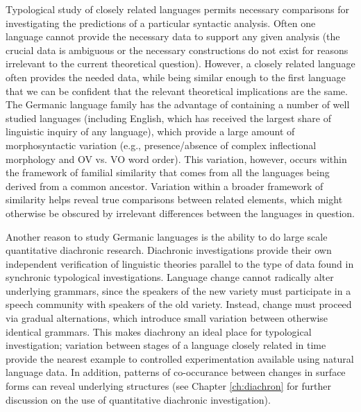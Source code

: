 Typological study of closely related languages permits necessary comparisons for investigating the predictions of a particular syntactic analysis. Often one language cannot provide the necessary data to support any given analysis (the crucial data is ambiguous or the necessary constructions do not exist for reasons irrelevant to the current theoretical question). However, a closely related language often provides the needed data, while being similar enough to the first language that we can be confident that the relevant theoretical implications are the same. The Germanic language family has the advantage of containing a number of well studied languages (including English, which has received the largest share of linguistic inquiry of any language), which provide a large amount of morphosyntactic variation (e.g., presence/absence of complex inflectional morphology and OV vs. VO word order). This variation, however, occurs within the framework of familial similarity that comes from all the languages being derived from a common ancestor. Variation within a broader framework of similarity helps reveal true comparisons between related elements, which might otherwise be obscured by irrelevant differences between the languages in question.

Another reason to study Germanic languages is the ability to do large scale quantitative diachronic research. Diachronic investigations provide their own independent verification of linguistic theories parallel to the type of data found in synchronic typological investigations. Language change cannot radically alter underlying grammars, since the speakers of the new variety must participate in a speech community with speakers of the old variety. Instead, change must proceed via gradual alternations, which introduce small variation between otherwise identical grammars. This makes diachrony an ideal place for typological investigation; variation between stages of a language closely related in time provide the nearest example to controlled experimentation available using natural language data. In addition, patterns of co-occurance between changes in surface forms can reveal underlying structures (see Chapter \ref{ch:diachron} for further discussion on the use of quantitative diachronic investigation).

